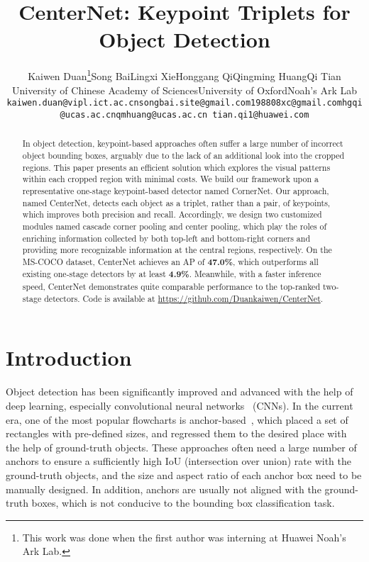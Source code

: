 \documentclass[10pt,twocolumn,letterpaper]{article}
\begin{document}
\title{CenterNet: Keypoint Triplets for Object Detection}
\author{Kaiwen Duan\thanks{This work was done when the first author was interning at Huawei Noah's Ark Lab.}\qquad Song Bai\qquad Lingxi Xie\qquad Honggang Qi\qquad Qingming Huang\qquad Qi Tian\\
University of Chinese Academy of Sciences\qquad University of Oxford\qquadHuawei Noah's Ark Lab\\
{\tt\small kaiwen.duan@vipl.ict.ac.cn\qquad songbai.site@gmail.com\qquad 198808xc@gmail.com\qquad hgqi@ucas.ac.cn\qquad qmhuang@ucas.ac.cn \qquad tian.qi1@huawei.com}}
\maketitle



\begin{abstract}
In object detection, keypoint-based approaches often suffer a large number of incorrect object bounding boxes, arguably due to the lack of an additional look into the cropped regions. This paper presents an efficient solution which explores the visual patterns within each cropped region with minimal costs. We build our framework upon a representative one-stage keypoint-based detector named CornerNet. Our approach, named CenterNet, detects each object as a triplet, rather than a pair, of keypoints, which improves both precision and recall. Accordingly, we design two customized modules named cascade corner pooling and center pooling, which play the roles of enriching information collected by both top-left and bottom-right corners and providing more recognizable information at the central regions, respectively. On the MS-COCO dataset, CenterNet achieves an AP of \textbf{47.0\%}, which outperforms all existing one-stage detectors by at least \textbf{4.9\%}. Meanwhile, with a faster inference speed, CenterNet demonstrates quite comparable performance to the top-ranked two-stage detectors. Code is available at \url{https://github.com/Duankaiwen/CenterNet}.
\end{abstract}\section{Introduction}
Object detection has been significantly improved and advanced with the help of deep learning, especially convolutional neural networks~\cite{girshick2014rich} (CNNs). In the current era, one of the most popular flowcharts is anchor-based~\cite{girshick2015fast,he2017mask,liu2016ssd,redmon2016you, ren2015faster}, which placed a set of rectangles with pre-defined sizes, and regressed them to the desired place with the help of ground-truth objects. These approaches often need a large number of anchors to ensure a sufficiently high IoU (intersection over union) rate with the ground-truth objects, and the size and aspect ratio of each anchor box need to be manually designed. In addition, anchors are usually not aligned with the ground-truth boxes, which is not conducive to the bounding box classification task.
\end{document}
